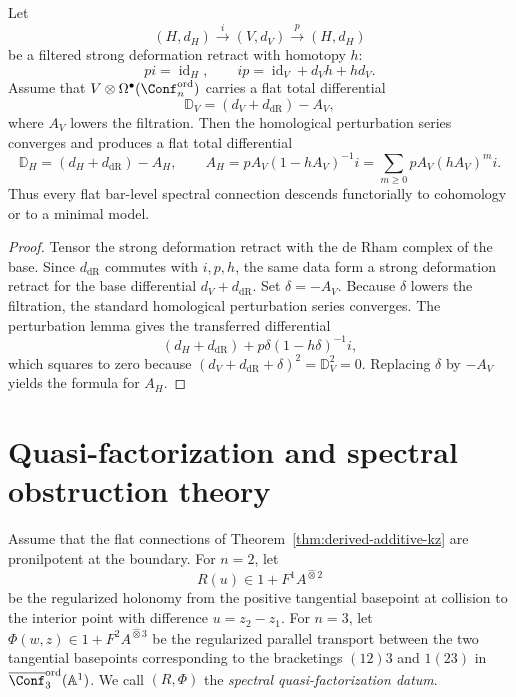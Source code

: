 \begin{theorem}
\ClaimStatusProvedHere
\label{thm:transfer-flat-spectral}
Let
\[
(H,d_H)
\xrightarrow{i}
(V,d_V)
\xrightarrow{p}
(H,d_H)
\]
be a filtered strong deformation retract with homotopy $h$:
\[
pi=\operatorname{id}_H,
\qquad
ip=\operatorname{id}_V+d_Vh+hd_V.
\]
Assume that $V\otimes \Omega^\bullet(\Conf_n^{\mathrm{ord}})$ carries a
flat total differential
\[
\mathbb D_V=(d_V+d_{\mathrm{dR}})-A_V,
\]
where $A_V$ lowers the filtration.  Then the homological perturbation
series converges and produces a flat total differential
\[
\mathbb D_H=(d_H+d_{\mathrm{dR}})-A_H,
\qquad
A_H=pA_V(1-hA_V)^{-1}i=
\sum_{m\ge 0} pA_V(hA_V)^mi.
\]
Thus every flat bar-level spectral connection descends functorially to
cohomology or to a minimal model.
\end{theorem}

\begin{proof}
Tensor the strong deformation retract with the de Rham complex of the
base.  Since $d_{\mathrm{dR}}$ commutes with $i,p,h$, the same data form a
strong deformation retract for the base differential
$d_V+d_{\mathrm{dR}}$.  Set $\delta=-A_V$.  Because $\delta$ lowers the
filtration, the standard homological perturbation series converges.
The perturbation lemma gives the transferred differential
\[
(d_H+d_{\mathrm{dR}})+p\delta(1-h\delta)^{-1}i,
\]
which squares to zero because
$(d_V+d_{\mathrm{dR}}+\delta)^2=\mathbb D_V^2=0$.
Replacing $\delta$ by $-A_V$ yields the formula for $A_H$.
\end{proof}

\section{Quasi-factorization and spectral obstruction theory}

\begin{definition}
Assume that the flat connections of
Theorem~\ref{thm:derived-additive-kz} are pronilpotent at the boundary.
For $n=2$, let
\[
R(u)\in 1+F^1A^{\widehat\otimes 2}
\]
be the regularized holonomy from the positive tangential basepoint at
collision to the interior point with difference $u=z_2-z_1$.
For $n=3$, let $\Phi(w,z)\in 1+F^2A^{\widehat\otimes 3}$ be the
regularized parallel transport between the two tangential basepoints
corresponding to the bracketings $(12)3$ and $1(23)$ in
$\overline{\Conf}_3^{\mathrm{ord}}(\mathbb A^1)$.
We call $(R,\Phi)$ the \emph{spectral quasi-factorization datum}.
\end{definition}

